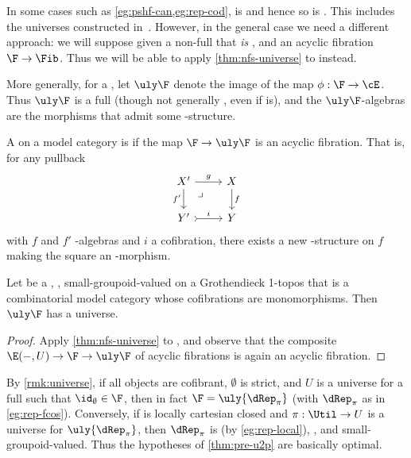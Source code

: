 In some cases such as \cref{eg:pshf-can,eg:rep-cod}, \Fib is \local and hence so is \Fibka.
This includes the universes constructed in~\cite{klv:ssetmodel,shulman:elreedy,cisinski:elegant}.
However, in the general case we need a different approach: we will suppose given a non-full \nfs \F that \emph{is} \local, and an acyclic fibration $\F\to\Fib$. Thus we will be able to apply \cref{thm:nfs-universe} to \F instead.

More generally, for a \nfs \F, let $\uly\F$ denote the image of the map $\phi:\F\to \cE$.
Thus $\uly\F$ is a full \nfs (though not generally \local, even if \F is), and the $\uly\F$-algebras are the morphisms that admit some \F-structure.

\begin{defn}\label{defn:stratified}
  A \nfs \F on a model category \E is \textbf{\stratified} if the map $\F \to \uly\F$ is an acyclic fibration.
  That is, for any pullback
  \[
    \begin{tikzcd}
      X' \ar[d,"f'"'] \ar[r,"g"] \ar[dr,phantom, near start,"\lrcorner"] & X \ar[d,"f"]\\
      Y' \ar[r,"i",tail] & Y
    \end{tikzcd}
  \]
  with $f$ and $f'$ \F-algebras and $i$ a cofibration, there exists a new \F-structure on $f$ making the square an \F-morphism.
\end{defn}

\begin{prop}\label{thm:pre-u2p}
  Let \F be a \local, \stratified, small-groupoid-valued \nfs on a Grothendieck 1-topos that is a combinatorial model category whose cofibrations are monomorphisms.
  Then $\uly\F$ has a universe.
\end{prop}
\begin{proof}
  Apply \cref{thm:nfs-universe} to \F, and observe that the composite $\E(-,U) \to \F \to \uly\F$ of acyclic fibrations is again an acyclic fibration.
\end{proof}

\begin{rmk}
  By \cref{rmk:universe}, if all objects are cofibrant, $\emptyset$ is strict, and $U$ is a universe for a full \nfs \F such that $\id_\emptyset\in\F$, then in fact $\F = \uly{\dRep_\pi}$ (with $\dRep_\pi$ as in \cref{eg:rep-fcos}).
  Conversely, if \E is locally cartesian closed and $\pi:\Util\to U$ is a universe for $\uly{\dRep_\pi}$, then $\dRep_\pi$ is \local (by \cref{eg:rep-local}), \stratified, and small-groupoid-valued.
  Thus the hypotheses of \cref{thm:pre-u2p} are basically optimal.
\end{rmk}

